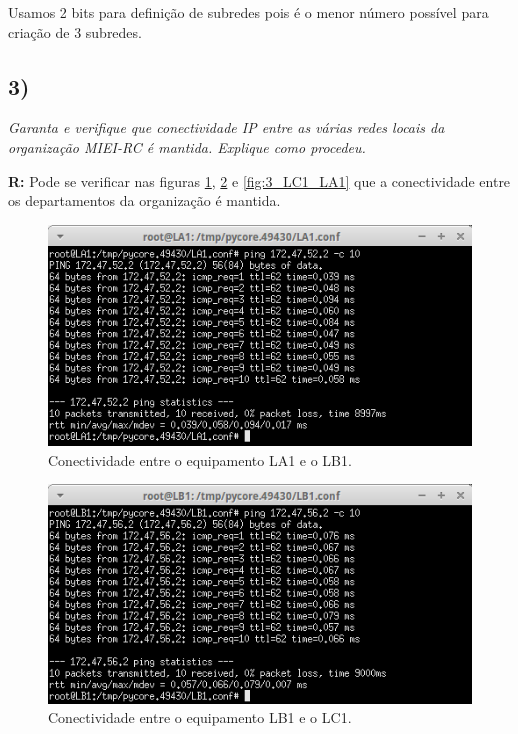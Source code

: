 \documentclass{llncs}
\begin{document}
Usamos 2 bits para definição de subredes pois é o menor número possível para criação
de 3 subredes.

\subsection{3)}
\emph{Garanta e verifique que conectividade IP entre as várias redes locais da organização MIEI-RC é mantida. Explique como procedeu.}
\\ \par
\textbf{R:} Pode se verificar nas figuras \ref{fig:3_LA1_LB1}, \ref{fig:3_LB1_LC1} e
\ref{fig:3_LC1_LA1} que a conectividade entre os departamentos da organização é
mantida.

\begin{figure}[H]
\begin{center}
\includegraphics[scale=0.60]{3_LA1_LB1.png} 
\end{center}
\caption{\label{fig:3_LA1_LB1} Conectividade entre o equipamento LA1 e o LB1.}
\end{figure}

\begin{figure}[H]
\begin{center}
\includegraphics[scale=0.60]{3_LB1_LC1.png} 
\end{center}
\caption{\label{fig:3_LB1_LC1} Conectividade entre o equipamento LB1 e o LC1.}
\end{figure}
\end{document}
